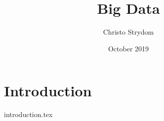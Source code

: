 \documentclass{book}
\title{Big Data}
\author{Christo Strydom}
\date{October 2019}
\begin{document}
\maketitle

\chapter{Introduction}
{introduction.tex}



\end{document}
